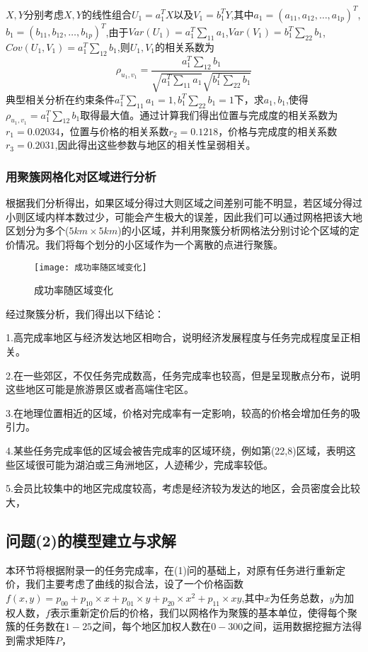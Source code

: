 \documentclass{ctexart}
\begin{document}
$X,Y$分别考虑$X,Y$的线性组合$U_1=a^{T}_{1}X$以及$V_1=b^{T}_{1}Y$,其中$a_1=(a_{11},a_{12},\dots,a_{1p})^T$,$b_1=(b_{11},b_{12},\dots,b_{1p})^T$,由于$Var(U_1)=a_{1}^{T}\sum_{11} a_1$,$Var(V_1)=b_{1}^{T}\sum_{22} b_1$,$Cov(U_1,V_1)=a_{1}^{T}\sum_{12} b_1$,则$U_1,V_1$的相关系数为$$\rho_{u_1,v_1}=\frac{a_{1}^{T}\sum_{12} b_1}{\sqrt{a_{1}^{T}\sum_{11} a_1} \sqrt{b_{1}^{T}\sum_{22} b_1}}$$
典型相关分析在约束条件$a_{1}^{T}\sum_{11} a_1=1,b_{1}^{T}\sum_{22} b_1=1$下，求$a_1,b_1$,使得
$\rho_{u_1,v_1}={a_{1}^{T}\sum_{12} b_1}$取得最大值。通过计算我们得出位置与完成度的相关系数为$r_1=0.02034$，位置与价格的相关系数$r_2=0.1218$，价格与完成度的相关系数$r_3=0.2031$,因此得出这些参数与地区的相关性呈弱相关。
\subsubsection{用聚簇网格化对区域进行分析}
根据我们分析得出，如果区域分得过大则区域之间差别可能不明显，若区域分得过小则区域内样本数过少，可能会产生极大的误差，因此我们可以通过网格把该大地区划分为多个($5km\times5km$)的小区域，并利用聚簇分析网格法分别讨论个区域的定价情况。我们将每个划分的小区域作为一个离散的点进行聚簇。


\begin{figure}[htbp] 
\centering
\texttt{[image: 成功率随区域变化]} 
\caption{成功率随区域变化}
\end{figure}

经过聚簇分析，我们得出以下结论：

1.高完成率地区与经济发达地区相吻合，说明经济发展程度与任务完成程度呈正相关。

2.在一些郊区，不仅任务完成数高，任务完成率也较高，但是呈现散点分布，说明这些地区可能是旅游景区或者高端住宅区。

3.在地理位置相近的区域，价格对完成率有一定影响，较高的价格会增加任务的吸引力。

4.某些任务完成率低的区域会被告完成率的区域环绕，例如第(22,8)区域，表明这些区域很可能为湖泊或三角洲地区，人迹稀少，完成率较低。

5.会员比较集中的地区完成度较高，考虑是经济较为发达的地区，会员密度会比较大，


\subsection{问题(2)的模型建立与求解}
本环节将根据附录一的任务完成率，在(1)问的基础上，对原有任务进行重新定价，我们主要考虑了曲线的拟合法，设了一个价格函数$f(x,y)=p_{00}+p_{10}\times x+ p_{01}\times y+p_{20}\times x^2+p_{11}\times xy$,其中$x$为任务总数，$y$为加权人数，$f$表示重新定价后的价格，我们以网格作为聚簇的基本单位，使得每个聚簇的任务数在$1-25$之间，每个地区加权人数在$0-300$之间，运用数据挖掘方法得到需求矩阵$P$，
\end{document}
